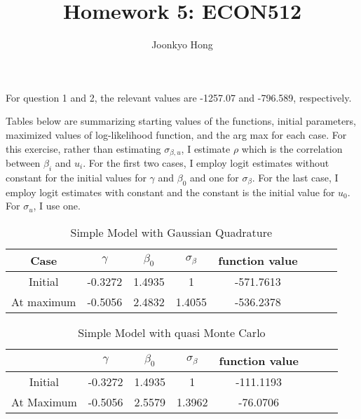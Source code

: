 \documentclass[10pt, letterpaper]{article}
\begin{document}
\title{Homework 5: ECON512}
\author{Joonkyo Hong}
\date{}
\maketitle
\smallskip

\noindent For question 1 and 2, the relevant values are -1257.07 and -796.589, respectively.

\noindent Tables below are summarizing starting values of the functions, initial parameters, maximized values of log-likelihood function, and the arg max for each case. For this exercise, rather than estimating $\sigma_{\beta,u}$, I estimate $\rho$ which is the correlation between $\beta_{i}$ and $u_{i}$. For the first two cases, I employ logit estimates without constant for the initial values for $\gamma$ and $\beta_{0}$ and one for $\sigma_{\beta}$. For the last case, I employ logit estimates with constant and the constant is the initial value for $u_{0}$. For $\sigma_{u}$, I use one.

\begin{table}[h!]
  \begin{center}
    \caption{Simple Model with Gaussian Quadrature}  
    \label{tab:start}
    \begin{tabular}{c|cccccc|c} %
      \hline\hline
       Case        &$ \gamma  $&$  \beta_{0} $&$ \sigma_{\beta} $& function value\\
      \hline
       Initial     & -0.3272  &  1.4935      &      1            &    -571.7613 \\
       At maximum  & -0.5056  &  2.4832      &    1.4055         &    -536.2378 \\    
      \hline      \hline
    \end{tabular}
  \end{center}
\end{table} 

\begin{table}[h!]
  \begin{center}
    \caption{Simple Model with quasi Monte Carlo}  
    \label{tab:start}
    \begin{tabular}{c|cccccc|c} %
      \hline\hline
                     &$ \gamma  $&$  \beta_{0} $&$ \sigma_{\beta} $& function value\\
      \hline
       Initial     & -0.3272  &  1.4935        &    1            &    -111.1193 \\       
       At Maximum  & -0.5056  &  2.5579        &    1.3962       &    -76.0706  \\       
      \hline      \hline
    \end{tabular}
  \end{center}
\end{table} 
\end{document}
